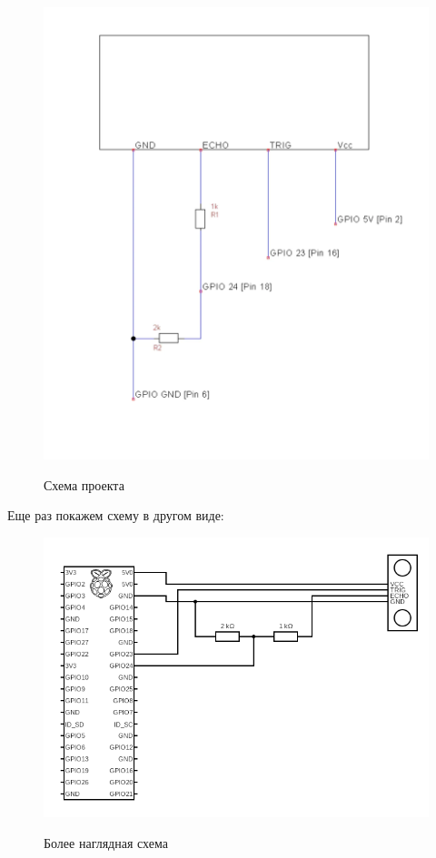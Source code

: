 \documentclass[a4paper, 14pt]{article}
\begin{document}
\begin{figure}[H]
	\centering
	\includegraphics[width=12cm]{screenshots/3.png}\\
	\caption{Схема проекта}
\end{figure}

Еще раз покажем схему в другом виде:

\begin{figure}[H]
	\centering
	\includegraphics[width=15cm]{screenshots/5.png}\\
	\caption{Более наглядная схема}
\end{figure}
\end{document}
